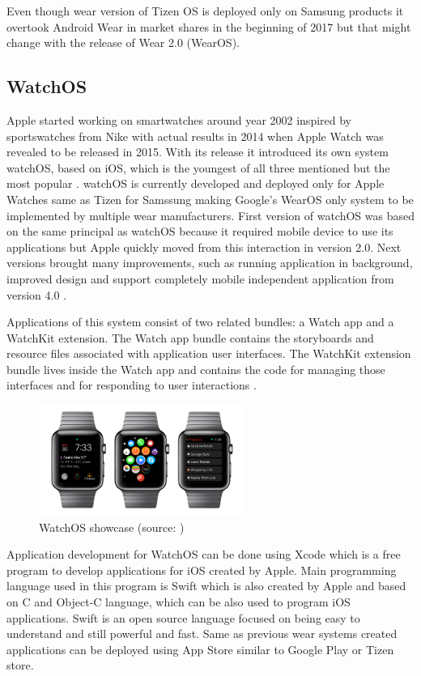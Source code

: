 Even though wear version of Tizen OS is deployed only on Samsung products it overtook Android Wear in market shares in the beginning of 2017 but that might change with the release of Wear 2.0 (WearOS). 

\subsection{WatchOS}\label{sec:WatchOS}
Apple started working on smartwatches around year 2002 inspired by sportswatches from Nike with actual results in 2014 when Apple Watch was revealed to be released in 2015. With its release it introduced its own system watchOS, based on iOS, which is the youngest of all three mentioned but the most popular \cite{ATOHAWWC}. watchOS is currently developed and deployed only for Apple Watches same as Tizen for Samssung making Google's WearOS only system to be implemented by multiple wear manufacturers. First version of watchOS was based on the same principal as watchOS because it required mobile device to use its applications but Apple quickly moved from this interaction in version 2.0. Next versions brought many improvements, such as running application in background, improved design and support completely mobile independent application from version 4.0 \cite{WOS9To5MAC}.

Applications of this system consist of two related bundles: a Watch app and a WatchKit extension. The Watch app bundle contains the storyboards and resource files associated with application user interfaces. The WatchKit extension bundle lives inside the Watch app and contains the code for managing those interfaces and for responding to user interactions \cite{AppleDev}.

\begin{figure}[H]
	\begin{centering}
		\includegraphics[width=0.6\textwidth]{img/apple_watchOs}
		\par\end{centering}
	\caption{WatchOS showcase (source: \cite{HTFAIAAW})\label{fig:WatchOS}}
	\label{fig06c04}
\end{figure}

Application development for WatchOS can be done using Xcode which is a free program to develop applications for iOS created by Apple. Main programming language used in this program is Swift which is also created by Apple and based on C and Object-C language, which can be also used to program iOS applications. Swift is an open source language focused on being easy to understand and still powerful and fast. Same as previous wear systems created applications can be deployed using App Store similar to Google Play or Tizen store.